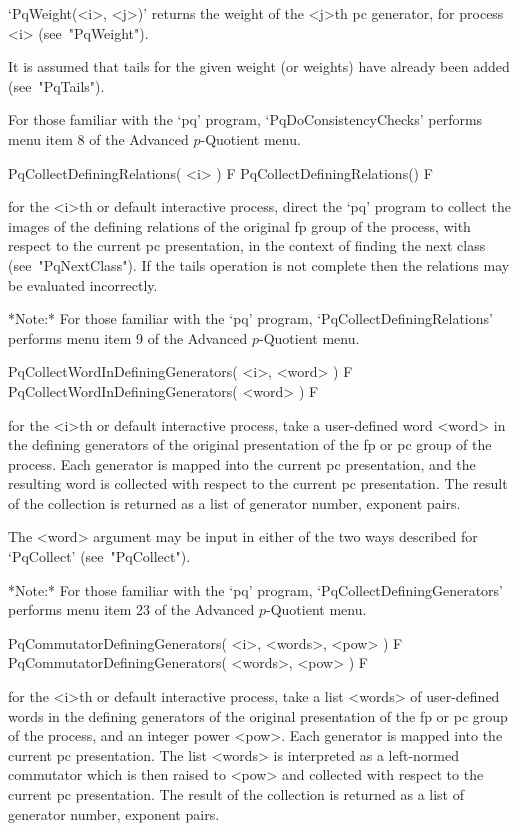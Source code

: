`PqWeight(<i>, <j>)' returns the weight of the <j>th  pc  generator,  for
process <i> (see~"PqWeight").

It is assumed that tails for the given weight (or weights)  have  already
been added (see~"PqTails").

For those familiar with the `pq' program, `PqDoConsistencyChecks' performs
menu item 8 of the Advanced $p$-Quotient menu.

\>PqCollectDefiningRelations( <i> ) F
\>PqCollectDefiningRelations() F

for the <i>th or default interactive {\ANUPQ} process,  direct  the  `pq'
program to collect the images of the defining relations of the original fp
group of the process, with respect to the current pc presentation, in the
context of finding the  next  class  (see~"PqNextClass").  If  the  tails
operation  is  not  complete  then  the  relations   may   be   evaluated
incorrectly.

*Note:*
For those familiar with  the  `pq'  program,  `PqCollectDefiningRelations'
performs menu item 9 of the Advanced $p$-Quotient menu.

\>PqCollectWordInDefiningGenerators( <i>, <word> ) F
\>PqCollectWordInDefiningGenerators( <word> ) F

for  the   <i>th  or  default  interactive  {\ANUPQ}   process,  take   a
user-defined word <word> in  the  defining  generators  of  the  original
presentation of the fp or pc group of  the  process.  Each  generator  is
mapped into the current  pc  presentation,  and  the  resulting  word  is
collected with respect to the current pc presentation. The result of  the
collection is returned as a list of generator number, exponent pairs.

The <word> argument may be input  in either of the two ways described for
`PqCollect' (see~"PqCollect").

*Note:*
For those familiar with the  `pq'  program,  `PqCollectDefiningGenerators'
performs menu item 23 of the Advanced $p$-Quotient menu.

\>PqCommutatorDefiningGenerators( <i>, <words>, <pow> ) F
\>PqCommutatorDefiningGenerators( <words>, <pow> ) F

for the <i>th or  default  interactive  {\ANUPQ}  process,  take  a  list
<words> of user-defined words in the defining generators of the  original
presentation of the fp or pc group of the process, and an  integer  power
<pow>. Each generator is mapped into the  current  pc  presentation.  The
list <words> is interpreted as a left-normed  commutator  which  is  then
raised  to  <pow>  and  collected  with  respect  to   the   current   pc
presentation. The result of the collection  is  returned  as  a  list  of
generator number, exponent pairs.

